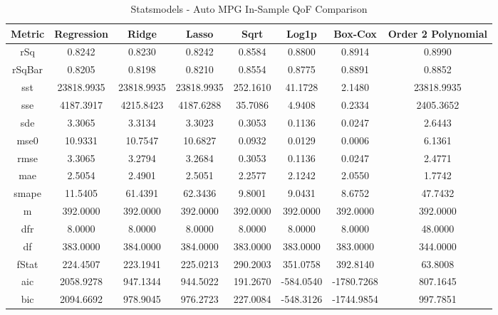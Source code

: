 \documentclass{article}
\begin{document}
\begin{table}[H]
\centering
\caption{Statsmodels - Auto MPG In-Sample QoF Comparison}
\label{tab:Statsmodels - Auto MPG In-Sample QoF Comparison}
\begin{tabular}{|c|c|c|c|c|c|c|c|}\hline
Metric & Regression & Ridge & Lasso & Sqrt & Log1p & Box-Cox & Order 2 Polynomial \\ \hline \hline
rSq & 0.8242 & 0.8230 & 0.8242 & 0.8584 & 0.8800 & 0.8914 & 0.8990 \\ \hline
rSqBar & 0.8205 & 0.8198 & 0.8210 & 0.8554 & 0.8775 & 0.8891 & 0.8852 \\ \hline
sst & 23818.9935 & 23818.9935 & 23818.9935 & 252.1610 & 41.1728 & 2.1480 & 23818.9935 \\ \hline
sse & 4187.3917 & 4215.8423 & 4187.6288 & 35.7086 & 4.9408 & 0.2334 & 2405.3652 \\ \hline
sde & 3.3065 & 3.3134 & 3.3023 & 0.3053 & 0.1136 & 0.0247 & 2.6443 \\ \hline
mse0 & 10.9331 & 10.7547 & 10.6827 & 0.0932 & 0.0129 & 0.0006 & 6.1361 \\ \hline
rmse & 3.3065 & 3.2794 & 3.2684 & 0.3053 & 0.1136 & 0.0247 & 2.4771 \\ \hline
mae & 2.5054 & 2.4901 & 2.5051 & 2.2577 & 2.1242 & 2.0550 & 1.7742 \\ \hline
smape & 11.5405 & 61.4391 & 62.3436 & 9.8001 & 9.0431 & 8.6752 & 47.7432 \\ \hline
m & 392.0000 & 392.0000 & 392.0000 & 392.0000 & 392.0000 & 392.0000 & 392.0000 \\ \hline
dfr & 8.0000 & 8.0000 & 8.0000 & 8.0000 & 8.0000 & 8.0000 & 48.0000 \\ \hline
df & 383.0000 & 384.0000 & 384.0000 & 383.0000 & 383.0000 & 383.0000 & 344.0000 \\ \hline
fStat & 224.4507 & 223.1941 & 225.0213 & 290.2003 & 351.0758 & 392.8140 & 63.8008 \\ \hline
aic & 2058.9278 & 947.1344 & 944.5022 & 191.2670 & -584.0540 & -1780.7268 & 807.1645 \\ \hline
bic & 2094.6692 & 978.9045 & 976.2723 & 227.0084 & -548.3126 & -1744.9854 & 997.7851 \\ \hline
\end{tabular}
\end{table}
\end{document}
